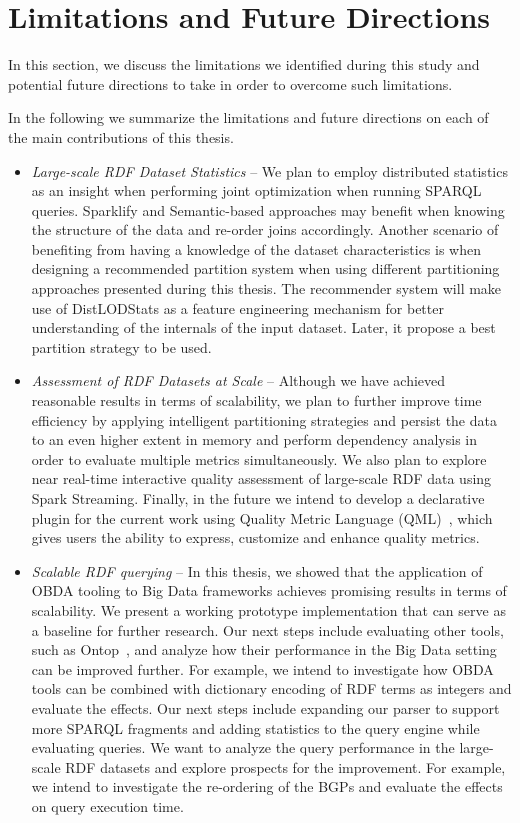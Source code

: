 \section{Limitations and Future Directions}
In this section, we discuss the limitations we identified during this study and potential future directions to take in order to overcome such limitations.

In the following we summarize the limitations and future directions on each of the main contributions of this thesis.

\begin{itemize}
    \item \textit{Large-scale \gls{RDF} Dataset Statistics} -- 
    We plan to employ distributed statistics as an insight when performing joint optimization when running \gls{SPARQL} queries. 
    Sparklify and Semantic-based approaches may benefit when knowing the structure of the data and re-order joins accordingly.
    Another scenario of benefiting from having a knowledge of the dataset characteristics is when designing a recommended partition system when using different partitioning approaches presented during this thesis.
    The recommender system will make use of DistLODStats as a feature engineering mechanism for better understanding of the internals of the input dataset. 
    Later, it propose a best partition strategy to be used.
    \item \textit{Assessment of \gls{RDF} Datasets at Scale} -- 
    Although we have achieved reasonable results in terms of scalability, we plan to further improve time efficiency by applying intelligent partitioning strategies and persist the data to an even higher extent in memory and perform dependency analysis in order to evaluate multiple metrics simultaneously. 
    We also plan to explore near real-time interactive quality assessment of large-scale \gls{RDF} data using Spark Streaming.
    Finally, in the future we intend to develop a declarative plugin for the current work using Quality Metric Language (QML)~\cite{debattista2016luzzu}, which gives users the ability to express, customize and enhance quality metrics.
    \item \textit{Scalable \gls{RDF} querying} -- 
    In this thesis, we showed that the application of OBDA tooling to Big Data frameworks achieves promising results in terms of scalability. 
    We present a working prototype implementation that can serve as a baseline for further research. 
    Our next steps include evaluating other tools, such as Ontop~\cite{Calvanese2017OntopAS}, and analyze how their performance in the Big Data setting can be improved further. 
    For example, we intend to investigate how OBDA tools can be combined with dictionary encoding of \gls{RDF} terms as integers and evaluate the effects.
    Our next steps include expanding our parser to support more \gls{SPARQL} fragments and adding statistics to the query engine while evaluating queries. 
    We want to analyze the query performance in the large-scale \gls{RDF} datasets and explore prospects for the improvement.
    For example, we intend to investigate the re-ordering of the \gls{BGP}s and evaluate the effects on query execution time.
    

\end{itemize}
